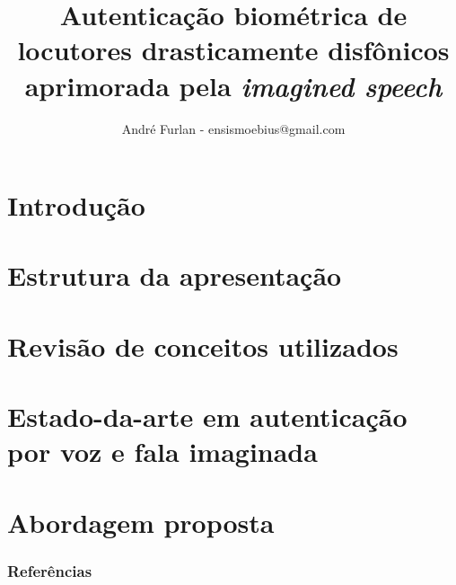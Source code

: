 

\title{Autenticação biométrica de locutores drasticamente disfônicos aprimorada pela \textit{imagined speech}}


\author{André Furlan - ensismoebius@gmail.com}

\date{\the\year}


	
	\frame{\titlepage}
	
	\section{Introdução}
		

	\section{Estrutura da apresentação}
		

	\section{Revisão de conceitos utilizados}
		
		
		
		
		
		
		
		
		
		
		
	
	\section{Estado-da-arte em autenticação por voz e fala imaginada}
		

	\section{Abordagem proposta}
		
		
	
	\begin{frame}[allowframebreaks]
		\frametitle{Referências}
		
	\end{frame}
	
